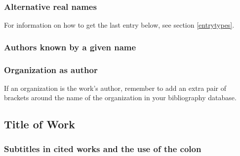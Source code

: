 \documentclass[11pt,letterpaper,oneside]{article}
\begin{document}
\begin{bibonly}
\nocite{ashe,creasey1976,creasey1978,creasey1966,morton,york}
\end{bibonly}

\subsubsection{Alternative real names}
\label{14.82}

For information on how to get the last entry below, see section
\ref{entrytypes}.

\begin{bibonly}
\nocite{doniger2000,oflaherty}
\end{bibonly}

\subsubsection{Authors known by a given name}

\begin{citebib}
\item \cite{elizabeth2000}
\end{citebib}

\subsubsection{Organization as author}
\label{14.84}

If an organization is the work's author, remember to add an extra pair
of brackets around the name of the organization in your bibliography
database.

\begin{citebib}
\item \cite{iso1997}
\item \cite{chicago2017}
\end{citebib}

\setcounter{subsection}{3}
\subsection{Title of Work}
\setcounter{subsection}{14}

\setcounter{subsubsection}{88}
\subsubsection{Subtitles in cited works and the use of the colon}
\end{document}
